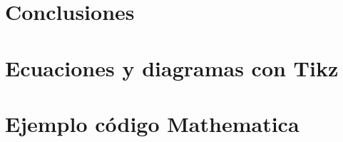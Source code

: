 \documentclass[letterpaper,spanish,12pt]{book}
\begin{document}
\chapter{Conclusiones}


\begin{appendices}
\appendix

\chapter{Ecuaciones y diagramas con Tikz}


\chapter{Ejemplo código Mathematica}


\end{appendices}



\backmatter
\end{document}
